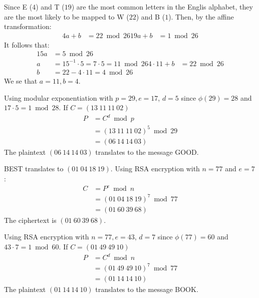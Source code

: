 \documentclass{article}
\begin{document}
\clearpage
\problem{}
Since E ($4$) and T ($19$) are the most common letters in the Englis alphabet, they are the most likely to be mapped to W ($22$) and B ($1$). Then, by the affine transformation:
\begin{align*}
    4a + b & = 22 \bmod 26
    19a + b & = 1 \bmod 26
\end{align*}
It follows that:
\begin{align*}
    15a & = 5 \bmod 26 \\
    a & = 15^{-1} \cdot 5 = 7 \cdot 5 = 11 \bmod 26
    4 \cdot 11 + b & = 22 \bmod 26 \\
    b & = 22 - 4 \cdot 11 = 4 \bmod 26
\end{align*}
We se that $a = 11, b = 4$.

\clearpage
\problem{}
Using modular exponentiation with $p = 29, e = 17$, $d = 5$ since $\phi(29) = 28$ and $17 \cdot 5 = 1 \bmod 28$. If $C = (13~11~11~02)$
\begin{align*}
    P & = C^d \bmod p \\
    & = {(13~11~11~02)}^5 \bmod 29 \\
    & = (06~14~14~03)
\end{align*}
The plaintext $(06~14~14~03)$ translates to the message GOOD.

\clearpage
\problem{}
BEST translates to $(01~04~18~19)$. Using RSA encryption with $n = 77$ and $e = 7$:
\begin{align*}
    C & = P^e \bmod n \\
    & = {(01~04~18~19)}^7 \bmod 77 \\
    & = (01~60~39~68)
\end{align*}
The ciphertext is $(01~60~39~68)$.

\clearpage
\problem{}
Using RSA encryption with $n = 77, e = 43$, $d = 7$ since $\phi(77) = 60$ and $43 \cdot 7 = 1 \bmod 60$. If $C = (01~49~49~10)$
\begin{align*}
    P & = C^d \bmod n \\
    & = {(01~49~49~10)}^7 \bmod 77 \\
    & = (01~14~14~10)
\end{align*}
The plaintext $(01~14~14~10)$ translates to the message BOOK.
\end{document}
